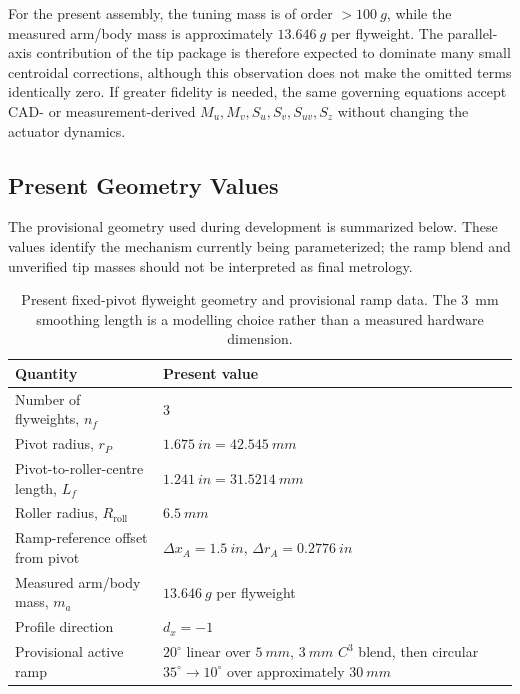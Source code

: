 \documentclass[11pt]{report}
\numberwithin{equation}{section}
\begin{document}
For the present assembly, the tuning mass is of order \(>\SI{100}{g}\), while
the measured arm/body mass is approximately \(\SI{13.646}{g}\) per flyweight.
The parallel-axis contribution of the tip package is therefore expected to
dominate many small centroidal corrections, although this observation does not
make the omitted terms identically zero. If greater fidelity is needed, the
same governing equations accept CAD- or measurement-derived
\(M_u,M_v,S_u,S_v,S_{uv},S_z\) without changing the actuator dynamics.

\subsection{Present Geometry Values}
\label{app:flyweight_present_values}

The provisional geometry used during development is summarized below. These
values identify the mechanism currently being parameterized; the ramp blend and
unverified tip masses should not be interpreted as final metrology.

\begin{table}[H]
\centering
\small
\renewcommand{\arraystretch}{1.15}
\begin{tabular}{p{}p{}}
\hline
\textbf{Quantity} & \textbf{Present value}\\
\hline
Number of flyweights, \(n_f\) & \(3\)\\
Pivot radius, \(r_P\) & \(\SI{1.675}{in}=\SI{42.545}{mm}\)\\
Pivot-to-roller-centre length, \(L_f\) & \(\SI{1.241}{in}=\SI{31.5214}{mm}\)\\
Roller radius, \(R_{\mathrm{roll}}\) & \(\SI{6.5}{mm}\)\\
Ramp-reference offset from pivot & \(\Delta x_A=\SI{1.5}{in}\), \(\Delta r_A=\SI{0.2776}{in}\)\\
Measured arm/body mass, \(m_a\) & \(\SI{13.646}{g}\) per flyweight\\
Profile direction & \(d_x=-1\)\\
Provisional active ramp & \(20^\circ\) linear over \(\SI{5}{mm}\), \(\SI{3}{mm}\) \(C^3\) blend, then circular \(35^\circ\rightarrow10^\circ\) over approximately \(\SI{30}{mm}\)\\
\hline
\end{tabular}
\caption{Present fixed-pivot flyweight geometry and provisional ramp data. The
\SI{3}{mm} smoothing length is a modelling choice rather than a measured
hardware dimension.}
\label{tab:appB_present_flyweight_values}
\end{table}
\end{document}
